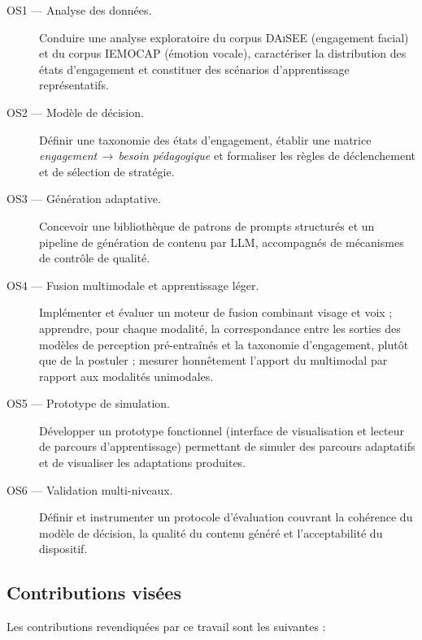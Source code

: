 \begin{description}
  \item[OS1 — Analyse des données.] Conduire une analyse exploratoire du corpus
  \textsc{DAiSEE} (engagement facial) et du corpus \textsc{IEMOCAP} (émotion
  vocale), caractériser la distribution des états d'engagement et constituer des
  scénarios d'apprentissage représentatifs.

  \item[OS2 — Modèle de décision.] Définir une taxonomie des états d'engagement,
  établir une matrice \emph{engagement\,$\rightarrow$\,besoin pédagogique} et
  formaliser les règles de déclenchement et de sélection de stratégie.

  \item[OS3 — Génération adaptative.] Concevoir une bibliothèque de patrons de
  prompts structurés et un pipeline de génération de contenu par LLM,
  accompagnés de mécanismes de contrôle de qualité.

  \item[OS4 — Fusion multimodale et apprentissage léger.] Implémenter et évaluer
  un moteur de fusion combinant visage et voix ; apprendre, pour chaque modalité,
  la correspondance entre les sorties des modèles de perception pré-entraînés et
  la taxonomie d'engagement, plutôt que de la postuler ; mesurer honnêtement
  l'apport du multimodal par rapport aux modalités unimodales.

  \item[OS5 — Prototype de simulation.] Développer un prototype fonctionnel
  (interface de visualisation et lecteur de parcours d'apprentissage) permettant
  de simuler des parcours adaptatifs et de visualiser les adaptations produites.

  \item[OS6 — Validation multi-niveaux.] Définir et instrumenter un protocole
  d'évaluation couvrant la cohérence du modèle de décision, la qualité du contenu
  généré et l'acceptabilité du dispositif.
\end{description}

\subsection*{Contributions visées}

Les contributions revendiquées par ce travail sont les suivantes :

